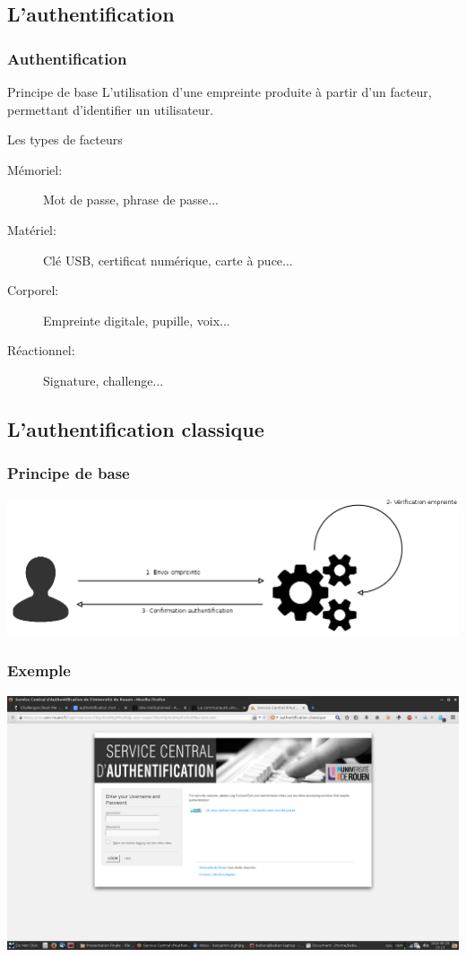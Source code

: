 \documentclass[xcolor=table]{beamer}
\begin{document}
\subsection{L'authentification}
\begin{frame}
\frametitle{Authentification}
\begin{block}{Principe de base}
L'utilisation d'une empreinte produite à partir d'un facteur, permettant d'identifier un utilisateur.
\end{block}
\begin{block}{Les types de facteurs}
\begin{description}
\item[Mémoriel:] Mot de passe, phrase de passe...
\item[Matériel:] Clé USB, certificat numérique, carte à puce...
\item[Corporel:] Empreinte digitale, pupille, voix...
\item[Réactionnel:] Signature, challenge...
\end{description}
\end{block}
\end{frame}


\subsection{L'authentification classique}
\begin{frame}
\frametitle{Principe de base}
\includegraphics[scale=0.24]{../graphics/authsimple.png}
\end{frame}

\begin{frame}
\frametitle{Exemple}
\includegraphics[scale=0.21]{../graphics/auth-mdp.png}
\end{frame}
\end{document}
